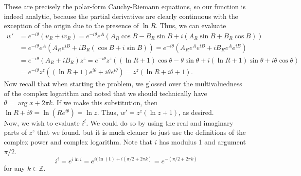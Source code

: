 \documentclass{article}
\begin{document}
These are precisely the polar-form Cauchy-Riemann equations, so our function is indeed analytic, because the partial derivatives are clearly continuous with the exception of the origin due to the presence of $\ln R$. Thus, we can evaluate
\begin{align*}
w'&=e^{-i\theta}(u_R+iv_R)=e^{-i\theta}e^A(A_R\cos B-B_R\sin B+i(A_R\sin B+B_R\cos B))\\&=
e^{-i\theta}e^A(A_Re^{iB}+iB_R(\cos B+i\sin B))=e^{-i\theta}(A_Re^Ae^{iB}+iB_Re^Ae^{iB})\\&=
e^{-i\theta}(A_R+iB_R)z^z=e^{-i\theta}z^z((\ln R+1)\cos\theta-\theta\sin\theta+i(\ln R+1)\sin\theta+i\theta\cos\theta)\\&=
e^{-i\theta}z^z((\ln R+1)e^{i\theta}+i\theta e^{i\theta})=z^z(\ln R+i\theta+1).
\end{align*}
Now recall that when starting the problem, we glossed over the multivaluedness of the complex logarithm and noted that we should technically have $\theta=\arg x+2\pi k$. If we make this substitution, then $\ln R+i\theta=\ln(Re^{i\theta})=\ln z$. Thus, $w'=z^z(\ln z+1)$, as desired.\\
Now, we wish to evaluate $i^i$. We could do so by using the real and imaginary parts of $z^z$ that we found, but it is much cleaner to just use the definitions of the complex power and complex logarithm. Note that $i$ has modulus 1 and argument $\pi/2$.
\[
i^i=e^{i\ln i}=e^{i(\ln(1)+i(\pi/2+2\pi k)}=e^{-(\pi/2+2\pi k)}
\]
for any $k\in\mathbb{Z}$.
\end{document}
